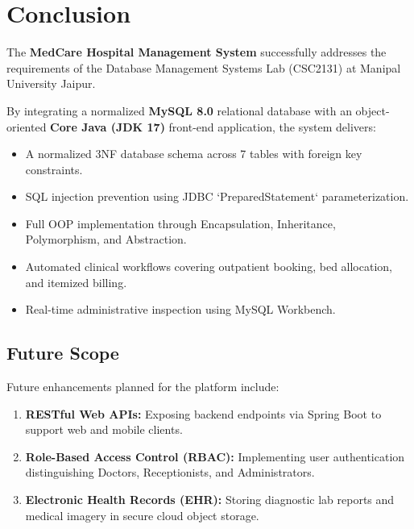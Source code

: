 \documentclass[12pt,a4paper]{article}
\begin{document}
\section{Conclusion}
\label{sec:conclusion}

The \textbf{MedCare Hospital Management System} successfully addresses the requirements of the Database Management Systems Lab (CSC2131) at Manipal University Jaipur. 

By integrating a normalized \textbf{MySQL 8.0} relational database with an object-oriented \textbf{Core Java (JDK 17)} front-end application, the system delivers:
\begin{itemize}[noitemsep]
    \item A normalized 3NF database schema across 7 tables with foreign key constraints.
    \item SQL injection prevention using JDBC `PreparedStatement` parameterization.
    \item Full OOP implementation through Encapsulation, Inheritance, Polymorphism, and Abstraction.
    \item Automated clinical workflows covering outpatient booking, bed allocation, and itemized billing.
    \item Real-time administrative inspection using MySQL Workbench.
\end{itemize}

\subsection{Future Scope}
Future enhancements planned for the platform include:
\begin{enumerate}[noitemsep]
    \item \textbf{RESTful Web APIs:} Exposing backend endpoints via Spring Boot to support web and mobile clients.
    \item \textbf{Role-Based Access Control (RBAC):} Implementing user authentication distinguishing Doctors, Receptionists, and Administrators.
    \item \textbf{Electronic Health Records (EHR):} Storing diagnostic lab reports and medical imagery in secure cloud object storage.
\end{enumerate}

\end{document}
